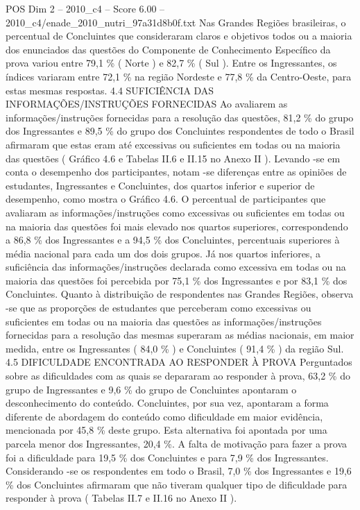\begin{textsample}{POS Dim 2 – 2010\_c4 – Score 6.00 – 2010\_c4/enade\_2010\_nutri\_97a31d8b0f.txt}
Nas Grandes Regiões brasileiras, o percentual de Concluintes que consideraram claros e objetivos todos ou a maioria dos enunciados das questões do Componente de Conhecimento Específico da prova variou entre 79,1 \% ( Norte ) e 82,7 \% ( Sul ).
Entre os Ingressantes, os índices variaram entre 72,1 \% na região Nordeste e 77,8 \% da Centro-Oeste, para estas mesmas respostas. 4.4 SUFICIÊNCIA DAS INFORMAÇÕES/INSTRUÇÕES FORNECIDAS Ao avaliarem as informações/instruções fornecidas para a resolução das questões, 81,2 \% do grupo dos Ingressantes e 89,5 \% do grupo dos Concluintes respondentes de todo o Brasil afirmaram que estas eram até excessivas ou suficientes em todas ou na maioria das questões ( Gráfico 4.6 e Tabelas II.6 e II.15 no Anexo II ).
Levando -se em conta o desempenho dos participantes, notam -se diferenças entre as opiniões de estudantes, Ingressantes e Concluintes, dos quartos inferior e superior de desempenho, como mostra o Gráfico 4.6.
O percentual de participantes que avaliaram as informações/instruções como excessivas ou suficientes em todas ou na maioria das questões foi mais elevado nos quartos superiores, correspondendo a 86,8 \% dos Ingressantes e a 94,5 \% dos Concluintes, percentuais superiores à média nacional para cada um dos dois grupos.
Já nos quartos inferiores, a suficiência das informações/instruções declarada como excessiva em todas ou na maioria das questões foi percebida por 75,1 \% dos Ingressantes e por 83,1 \% dos Concluintes.
Quanto à distribuição de respondentes nas Grandes Regiões, observa -se que as proporções de estudantes que perceberam como excessivas ou suficientes em todas ou na maioria das questões as informações/instruções fornecidas para a resolução das mesmas superaram as médias nacionais, em maior medida, entre os Ingressantes ( 84,0 \% ) e Concluintes ( 91,4 \% ) da região Sul. 4.5 DIFICULDADE ENCONTRADA AO RESPONDER À PROVA Perguntados sobre as dificuldades com as quais se depararam ao responder à prova, 63,2 \% do grupo de Ingressantes e 9,6 \% do grupo de Concluintes apontaram o desconhecimento do conteúdo.
Concluintes, por sua vez, apontaram a forma diferente de abordagem do conteúdo como dificuldade em maior evidência, mencionada por 45,8 \% deste grupo.
Esta alternativa foi apontada por uma parcela menor dos Ingressantes, 20,4 \%.
A falta de motivação para fazer a prova foi a dificuldade para 19,5 \% dos Concluintes e para 7,9 \% dos Ingressantes.
Considerando -se os respondentes em todo o Brasil, 7,0 \% dos Ingressantes e 19,6 \% dos Concluintes afirmaram que não tiveram qualquer tipo de dificuldade para responder à prova ( Tabelas II.7 e II.16 no Anexo II ).

\end{textsample}
